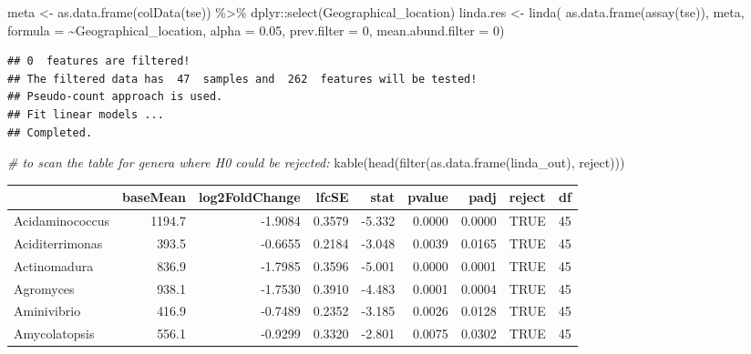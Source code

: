 \documentclass[
]{book}
\newenvironment{Shaded}{\begin{snugshade}}{\end{snugshade}}
\newcommand{\AttributeTok}[1]{\textcolor[rgb]{0.77,0.63,0.00}{#1}}
\newcommand{\CommentTok}[1]{\textcolor[rgb]{0.56,0.35,0.01}{\textit{#1}}}
\newcommand{\DecValTok}[1]{\textcolor[rgb]{0.00,0.00,0.81}{#1}}
\newcommand{\FloatTok}[1]{\textcolor[rgb]{0.00,0.00,0.81}{#1}}
\newcommand{\FunctionTok}[1]{\textcolor[rgb]{0.00,0.00,0.00}{#1}}
\newcommand{\NormalTok}[1]{#1}
\newcommand{\OtherTok}[1]{\textcolor[rgb]{0.56,0.35,0.01}{#1}}
\newcommand{\SpecialCharTok}[1]{\textcolor[rgb]{0.00,0.00,0.00}{#1}}
\newcommand{\StringTok}[1]{\textcolor[rgb]{0.31,0.60,0.02}{#1}}
\begin{document}
\begin{Shaded}
\begin{Highlighting}[]
\NormalTok{meta }\OtherTok{\textless{}{-}} \FunctionTok{as.data.frame}\NormalTok{(}\FunctionTok{colData}\NormalTok{(tse)) }\SpecialCharTok{\%\textgreater{}\%}\NormalTok{ dplyr}\SpecialCharTok{::}\FunctionTok{select}\NormalTok{(Geographical\_location)}
\NormalTok{linda.res }\OtherTok{\textless{}{-}} \FunctionTok{linda}\NormalTok{(}
  \FunctionTok{as.data.frame}\NormalTok{(}\FunctionTok{assay}\NormalTok{(tse)), }
\NormalTok{  meta, }
  \AttributeTok{formula =} \StringTok{\textquotesingle{}\textasciitilde{}Geographical\_location\textquotesingle{}}\NormalTok{, }
  \AttributeTok{alpha =} \FloatTok{0.05}\NormalTok{, }
  \AttributeTok{prev.filter =} \DecValTok{0}\NormalTok{, }
  \AttributeTok{mean.abund.filter =} \DecValTok{0}\NormalTok{)}
\end{Highlighting}
\end{Shaded}

\begin{verbatim}
## 0  features are filtered!
## The filtered data has  47  samples and  262  features will be tested!
## Pseudo-count approach is used.
## Fit linear models ...
## Completed.
\end{verbatim}

\begin{Shaded}
\end{Shaded}

\begin{Shaded}
\begin{Highlighting}[]
\CommentTok{\# to scan the table for genera where H0 could be rejected:}
\FunctionTok{kable}\NormalTok{(}\FunctionTok{head}\NormalTok{(}\FunctionTok{filter}\NormalTok{(}\FunctionTok{as.data.frame}\NormalTok{(linda\_out), reject)))}
\end{Highlighting}
\end{Shaded}

\begin{tabular}{l|r|r|r|r|r|r|l|r}
\hline
  & baseMean & log2FoldChange & lfcSE & stat & pvalue & padj & reject & df\\
\hline
Acidaminococcus & 1194.7 & -1.9084 & 0.3579 & -5.332 & 0.0000 & 0.0000 & TRUE & 45\\
\hline
Aciditerrimonas & 393.5 & -0.6655 & 0.2184 & -3.048 & 0.0039 & 0.0165 & TRUE & 45\\
\hline
Actinomadura & 836.9 & -1.7985 & 0.3596 & -5.001 & 0.0000 & 0.0001 & TRUE & 45\\
\hline
Agromyces & 938.1 & -1.7530 & 0.3910 & -4.483 & 0.0001 & 0.0004 & TRUE & 45\\
\hline
Aminivibrio & 416.9 & -0.7489 & 0.2352 & -3.185 & 0.0026 & 0.0128 & TRUE & 45\\
\hline
Amycolatopsis & 556.1 & -0.9299 & 0.3320 & -2.801 & 0.0075 & 0.0302 & TRUE & 45\\
\hline
\end{tabular}
\end{document}
